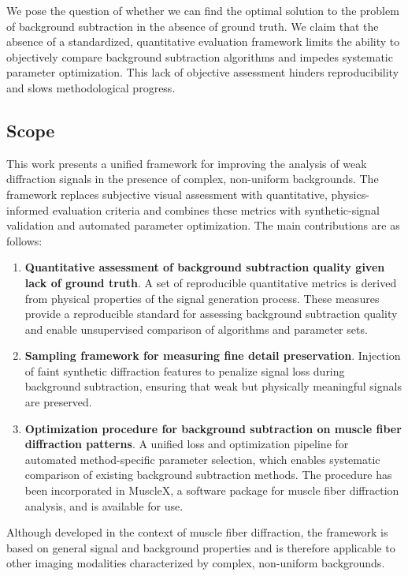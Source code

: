 \documentclass[iucr]{iucrjournals}
\begin{document}
We pose the question of whether we can find the optimal solution to the problem of background subtraction in the absence of ground truth. We claim that the absence of a standardized, quantitative evaluation framework limits the ability to objectively compare background subtraction algorithms and impedes systematic parameter optimization. This lack of objective assessment hinders reproducibility and slows methodological progress.

\subsection{Scope}

This work presents a unified framework for improving the analysis of weak diffraction signals in the presence of complex, non-uniform backgrounds. The framework replaces subjective visual assessment with quantitative, physics-informed evaluation criteria and combines these metrics with synthetic-signal validation and automated parameter optimization. The main contributions are as follows:

\begin{enumerate}

\item \textbf{Quantitative assessment of background subtraction quality given lack of ground truth}. A set of reproducible quantitative metrics is derived from physical properties of the signal generation process. These measures provide a reproducible standard for assessing background subtraction quality and enable unsupervised comparison of algorithms and parameter sets.

\item \textbf{Sampling framework for measuring fine detail preservation}. Injection of faint synthetic diffraction features to penalize signal loss during background subtraction, ensuring that weak but physically meaningful signals are preserved.

\item \textbf{Optimization procedure for background subtraction on muscle fiber diffraction patterns}. A unified loss and optimization pipeline for automated method-specific parameter selection, which enables systematic comparison of existing background subtraction methods. The procedure has been incorporated in MuscleX, a software package for muscle fiber diffraction analysis, and is available for use.

\end{enumerate}

Although developed in the context of muscle fiber diffraction, the framework is based on general signal and background properties and is therefore applicable to other imaging modalities characterized by complex, non-uniform backgrounds.
\end{document}
